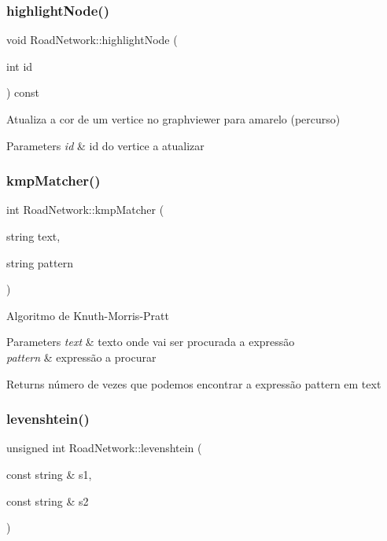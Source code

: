 \subsubsection{\texorpdfstring{highlight\+Node()}{highlightNode()}}
{\footnotesize\ttfamily void Road\+Network\+::highlight\+Node (\begin{DoxyParamCaption}\item[{int}]{id }\end{DoxyParamCaption}) const}

Atualiza a cor de um vertice no graphviewer para amarelo (percurso) 
\begin{DoxyParams}{Parameters}
{\em id} & id do vertice a atualizar \\
\hline
\end{DoxyParams}
\mbox{\label{class_road_network_ad18485ed1a0f77084570e79dad17f0fc}} 
\subsubsection{\texorpdfstring{kmp\+Matcher()}{kmpMatcher()}}
{\footnotesize\ttfamily int Road\+Network\+::kmp\+Matcher (\begin{DoxyParamCaption}\item[{string}]{text,  }\item[{string}]{pattern }\end{DoxyParamCaption})}

Algoritmo de Knuth-\/\+Morris-\/\+Pratt 
\begin{DoxyParams}{Parameters}
{\em text} & texto onde vai ser procurada a expressão \\
\hline
{\em pattern} & expressão a procurar \\
\hline
\end{DoxyParams}
\begin{DoxyReturn}{Returns}
número de vezes que podemos encontrar a expressão pattern em text 
\end{DoxyReturn}
\mbox{\label{class_road_network_ab44b652ce962b708421da08cd05e7477}} 
\subsubsection{\texorpdfstring{levenshtein()}{levenshtein()}}
{\footnotesize\ttfamily unsigned int Road\+Network\+::levenshtein (\begin{DoxyParamCaption}\item[{const string \&}]{s1,  }\item[{const string \&}]{s2 }\end{DoxyParamCaption})}

